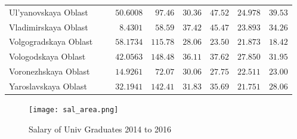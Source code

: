 \documentclass[alpha-refs]{wiley-article-05g}
\begin{document}
{\begin{longtable}{lcccccc}
Ul'yanovskaya Oblast  & $\phantom{0}\phantom{-}50.6008$ & $\phantom{0}97.46$ & $30.36$ & $47.52$ & $24.978$ & $39.53$ \\
Vladimirskaya Oblast  & $\phantom{00}\phantom{-}8.4301$ & $\phantom{0}58.59$ & $37.42$ & $45.47$ & $23.893$ & $34.26$ \\
Volgogradskaya Oblast  & $\phantom{0}\phantom{-}58.1734$ & $115.78$ & $28.06$ & $23.50$ & $21.873$ & $18.42$ \\
Vologodskaya Oblast  & $\phantom{0}\phantom{-}42.0563$ & $148.48$ & $36.11$ & $37.62$ & $27.850$ & $31.95$ \\
Voronezhskaya Oblast  & $\phantom{0}\phantom{-}14.9261$ & $\phantom{0}72.07$ & $30.06$ & $27.75$ & $22.511$ & $23.00$ \\
Yaroslavskaya Oblast  & $\phantom{0}\phantom{-}32.1941$ & $142.41$ & $31.83$ & $35.69$ & $21.751$ & $28.06$ \\
		\hline 
	\end{longtable}
 
}
 

\begin{center}
	\begin{figure}[htbp!]
\begin{minipage}[b]{1\linewidth}
			\centering
			\texttt{[image: sal\_area.png]}
		\end{minipage}
			\caption{Salary of Univ Graduates 2014 to 2016}\label{fig:7.6}
	\end{figure}
\end{center}
\end{document}
